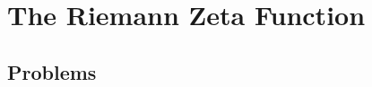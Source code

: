 \documentclass[12pt]{amsbook}
\begin{document}
\chapter{The Riemann Zeta Function}

\newcommand{\li}{\operatorname{li}}
\newcommand{\Log}{\operatorname{Log}}
\newcommand{\Arg}{\operatorname{Arg}}
\newcommand{\Mhat}{\widehat{M}}
\newcommand{\psihat}{\widehat{\psi}}



\section{Problems}














\end{document}
